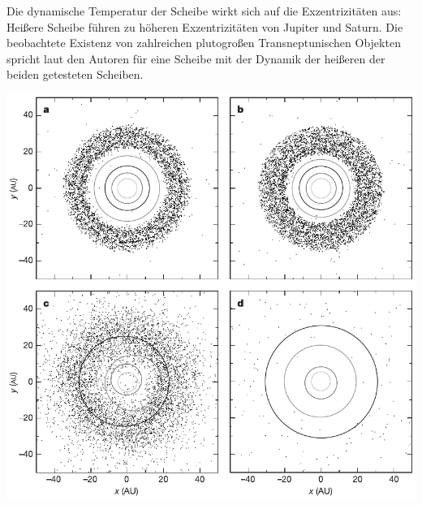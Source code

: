 \documentclass[10pt,a4paper,twoside]{article}
\renewenvironment{figure}{}{}
\begin{document}
Die dynamische Temperatur der Scheibe wirkt sich auf die Exzentrizitäten aus: Heißere Scheibe führen zu höheren Exzentrizitäten von Jupiter und Saturn. Die beobachtete Existenz von zahlreichen plutogroßen Transneptunischen Objekten spricht laut den Autoren für eine Scheibe mit der Dynamik der heißeren der beiden getesteten Scheiben\cite{Tsiganis2005}. %



\begin{figure}[tbn]
\includegraphics[scale=1]{img/Gomes2005-2.pdf}
\caption{•}
\end{figure}

\FloatBarrier
\end{document}
